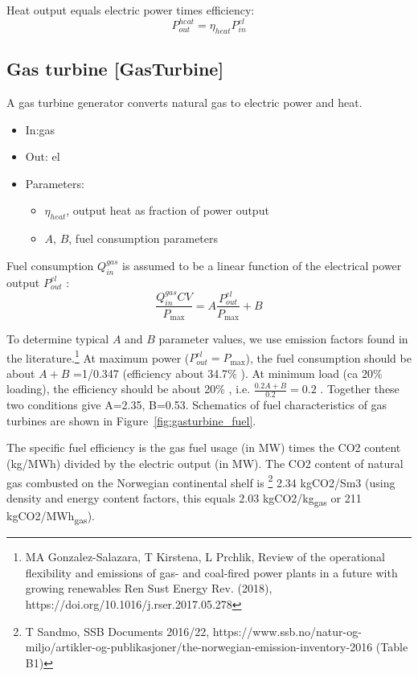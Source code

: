 \documentclass[12pt]{article}
\begin{document}
Heat output equals electric power times efficiency:
\begin{equation}
	P_{out}^{heat}= \eta _{heat}P_{in}^{el}
\end{equation}



\subsection{Gas turbine [GasTurbine]}
A gas turbine generator converts natural gas to electric power and heat.

\begin{itemize}
\item In:gas
\item Out: el
\item Parameters:
\begin{itemize}[noitemsep,topsep=0pt]
	\item $\eta_{heat}$,  output heat as fraction of power output
	\item 	$A$, $B$, fuel consumption parameters
\end{itemize}
\end{itemize}


\medskip\noindent

Fuel consumption  \( Q_{in}^{gas} \)  is assumed to be a linear function of the electrical power output  \( P_{out}^{el} \) :
\begin{equation}
	 \frac{Q_{in}^{gas} CV}{P_{\max }}=A\frac{P_{out}^{el}}{P_{\max }}+B 
\end{equation}


To determine typical $A$ and $B$ parameter values, we use
emission factors found in the literature.\footnote{ MA Gonzalez-Salazara, T Kirstena, L Prchlik, Review of the operational flexibility and emissions of gas- and coal-fired power plants in a future with growing renewables Ren Sust Energy Rev. (2018), https://doi.org/10.1016/j.rser.2017.05.278  }
%
At maximum power (\( P_{out}^{el}=P_{\max } \)), the fuel consumption should be about  \( A+B \) =1/0.347 (efficiency about 34.7$\%$ ). At minimum load (ca 20$\%$  loading), the efficiency should be about 20$\%$ , i.e.  \( \frac{0.2A+B}{0.2}=0.2 \) . Together these two conditions give A=2.35, B=0.53. Schematics of fuel characteristics of gas turbines are shown in Figure~\ref{fig:gasturbine_fuel}.

The specific fuel efficiency is the gas fuel usage (in MW) times the CO2 content (kg/MWh) divided by the electric output (in MW). The CO2 content of natural gas combusted on the Norwegian continental shelf is%
\footnote{T Sandmo, SSB Documents 2016/22, https://www.ssb.no/natur-og-miljo/artikler-og-publikasjoner/the-norwegian-emission-inventory-2016 (Table B1) } 
2.34 kgCO2/Sm3 (using density and energy content factors, this equals 2.03 kgCO2/kg\textsubscript{gas} 
or 211 kgCO2/MWh\textsubscript{gas}). 
\end{document}
